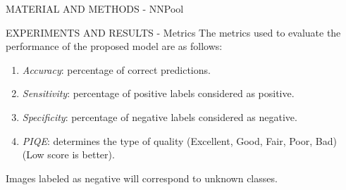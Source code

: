\begin{frame}{MATERIAL AND METHODS - NNPool}
\begin{minipage}{\linewidth}
\begin{minipage}{0.45\linewidth}
\begin{figure}[h!]
                \centering
            \end{figure}
        \end{minipage}
    \end{minipage}    
\end{frame}

\begin{frame}{EXPERIMENTS AND RESULTS - Metrics}
    The metrics used to evaluate the performance of the proposed model are as follows:
    \begin{enumerate}
        \item \emph{Accuracy}: percentage of correct predictions.
        \item \emph{Sensitivity}: percentage of positive labels considered as positive.
        \item \emph{Specificity}: percentage of negative labels considered as negative.
        \item \emph{PIQE}: determines the type of quality (Excellent, Good, Fair, Poor, Bad) (Low score is better).
    \end{enumerate}
    Images labeled as negative will correspond to unknown classes.
\end{frame}

